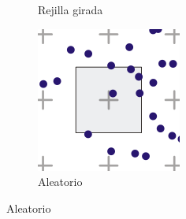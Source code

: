 \begin{figure}[htbp]
\begin{subfigure}[b]{0.25\textwidth}
        \caption{Rejilla girada}
    \end{subfigure}
    \hfill
    \begin{subfigure}[b]{0.25\textwidth}
        \centering
        \includegraphics[width=\textwidth]{Plantilla-TFG-master/img/aa3.png}
        \caption{Aleatorio}
    \end{subfigure}
    
    \medskip
    

\end{figure}
